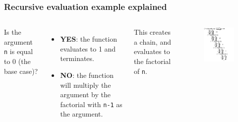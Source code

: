 \documentclass{beamer}
\begin{document}
\begin{frame}[fragile]
	\frametitle{Recursive evaluation example explained}

	\begin{columns}[c] %
		
		
		
		Is the argument \texttt{n} is equal to 0 (the base case)?
			\begin{itemize}
				\item \textbf{YES}: the function evaluates to 1 and terminates.
				\item \textbf{NO}: the function will multiply the argument by the factorial with \texttt{n-1} as the argument.\\
			\end{itemize}
		
		
		This creates a chain, and evaluates to the factorial of \texttt{n}.
		
		  
		
		\begin{figure}
			\includegraphics[width=1\linewidth]{../img/factorial}
		\end{figure}

	\end{columns}

\end{frame}
\end{document}
